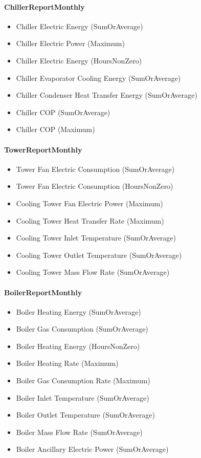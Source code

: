 \paragraph{ChillerReportMonthly}\label{chillerreportmonthly}

\begin{itemize}
\item
  Chiller Electric Energy (SumOrAverage)
\item
  Chiller Electric Power (Maximum)
\item
  Chiller Electric Energy (HoursNonZero)
\item
  Chiller Evaporator Cooling Energy (SumOrAverage)
\item
  Chiller Condenser Heat Transfer Energy (SumOrAverage)
\item
  Chiller COP (SumOrAverage)
\item
  Chiller COP (Maximum)
\end{itemize}

\paragraph{TowerReportMonthly}\label{towerreportmonthly}

\begin{itemize}
\item
  Tower Fan Electric Consumption (SumOrAverage)
\item
  Tower Fan Electric Consumption (HoursNonZero)
\item
  Cooling Tower Fan Electric Power (Maximum)
\item
  Cooling Tower Heat Transfer Rate (Maximum)
\item
  Cooling Tower Inlet Temperature (SumOrAverage)
\item
  Cooling Tower Outlet Temperature (SumOrAverage)
\item
  Cooling Tower Mass Flow Rate (SumOrAverage)
\end{itemize}

\paragraph{BoilerReportMonthly}\label{boilerreportmonthly}

\begin{itemize}
\item
  Boiler Heating Energy (SumOrAverage)
\item
  Boiler Gas Consumption (SumOrAverage)
\item
  Boiler Heating Energy (HoursNonZero)
\item
  Boiler Heating Rate (Maximum)
\item
  Boiler Gas Consumption Rate (Maximum)
\item
  Boiler Inlet Temperature (SumOrAverage)
\item
  Boiler Outlet Temperature (SumOrAverage)
\item
  Boiler Mass Flow Rate (SumOrAverage)
\item
  Boiler Ancillary Electric Power (SumOrAverage)
\end{itemize}

